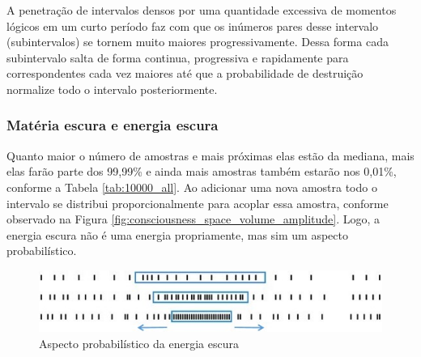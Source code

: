 A penetração de intervalos densos por uma quantidade excessiva de momentos lógicos em um curto período faz com que os inúmeros pares desse intervalo (subintervalos) se tornem muito maiores progressivamente. Dessa forma cada subintervalo salta de forma continua, progressiva e rapidamente para correspondentes cada vez maiores até que a probabilidade de destruição normalize todo o intervalo posteriormente.

\subsubsection{Matéria escura e energia escura}
Quanto maior o número de amostras e mais próximas elas estão da mediana, mais elas farão parte dos 99,99\% e ainda mais amostras também estarão nos 0,01\%, conforme a Tabela \ref{tab:10000_all}. Ao adicionar uma nova amostra todo o intervalo se distribui proporcionalmente para acoplar essa amostra, conforme observado na Figura \ref{fig:consciousness_space_volume_amplitude}. Logo, a energia escura não é uma energia propriamente, mas sim um aspecto probabilístico.
	\begin{figure}[H]
	\caption{Aspecto probabilístico da energia escura}
	\label{fig:consciousness_dark_matter_dark_energy}
	\centering
	\includegraphics[scale=.9]{sections/images/consciousness_dark_matter_dark_energy.jpg}
	\end{figure}

